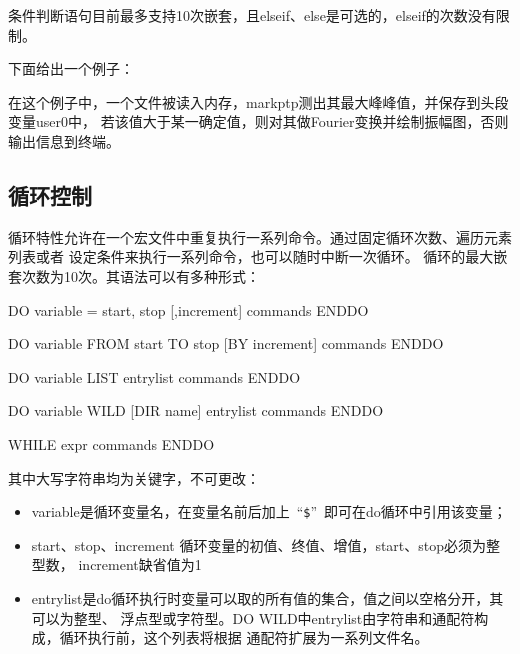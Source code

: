 条件判断语句目前最多支持10次嵌套，且elseif、else是可选的，elseif的次数没有限制。

下面给出一个例子：
在这个例子中，一个文件被读入内存，markptp测出其最大峰峰值，并保存到头段变量user0中，
若该值大于某一确定值，则对其做Fourier变换并绘制振幅图，否则输出信息到终端。

\subsection{循环控制}
循环特性允许在一个宏文件中重复执行一系列命令。通过固定循环次数、遍历元素列表或者
设定条件来执行一系列命令，也可以随时中断一次循环。
循环的最大嵌套次数为10次。其语法可以有多种形式：
\begin{SACCode}
DO variable = start, stop [,increment]
    commands
ENDDO
\end{SACCode}

\begin{SACCode}
DO variable FROM start TO stop [BY increment]
    commands
ENDDO
\end{SACCode}

\begin{SACCode}
DO variable LIST entrylist
    commands
ENDDO
\end{SACCode}

\begin{SACCode}
DO variable WILD [DIR name] entrylist
    commands
ENDDO
\end{SACCode}

\begin{SACCode}
WHILE expr
    commands
ENDDO
\end{SACCode}
其中大写字符串均为关键字，不可更改：
\begin{itemize}
\item variable是循环变量名，在变量名前后加上~``\verb+$+''~即可在do循环中引用该变量；
\item start、stop、increment 循环变量的初值、终值、增值，start、stop必须为整型数，
    increment缺省值为1
\item entrylist是do循环执行时变量可以取的所有值的集合，值之间以空格分开，其可以为整型、
  浮点型或字符型。DO WILD中entrylist由字符串和通配符构成，循环执行前，这个列表将根据
  通配符扩展为一系列文件名。
\end{itemize}

